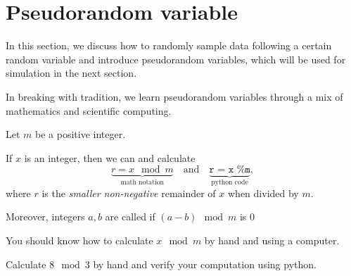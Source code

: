\documentclass[../main.tex]{subfiles}
\begin{document}
 \section{Pseudorandom variable}

In this section, we discuss how to randomly sample data following a certain random variable and introduce pseudorandom variables, which will be used for simulation in the next section.

In breaking with tradition, we learn pseudorandom variables through a mix of mathematics and scientific computing. 

\begin{definition}
  Let \(m\) be a positive integer. 

  If \(x\) is an integer, then we can  and calculate
  \[
    \underbrace{r = x \mod{m}}_{\text{math notation}} 
    \quad\text{and}\quad
    \underbrace{\texttt{r = x \% m}}_{\text{python code}},
  \] where \(r\) is the \emph{smaller non-negative} remainder of \(x\) when divided by \(m\).  

  Moreover, integers \(a,b\) are called  if \((a - b) \mod{m}\) is \(0\)
\end{definition}
\faStar{} You should know how to calculate \(x \mod{m}\) by hand and using a computer.

\begin{example}
  Calculate \(8 \mod 3\) by hand and verify your computation using python.

\end{example}

%
%
\end{document}
